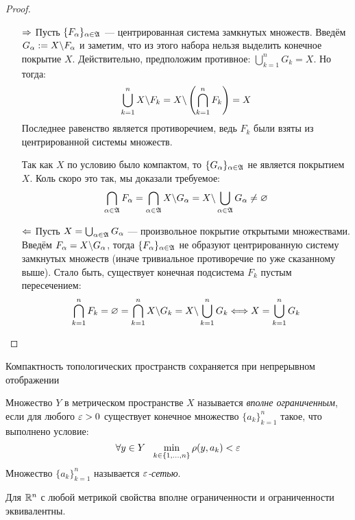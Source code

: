 \begin{proof}~
	\begin{itemize}
		\item[$\Rightarrow$] Пусть $\{F_\alpha\}_{\alpha \in \mathfrak{A}}$ --- центрированная система замкнутых множеств. Введём $G_\alpha := X \backslash F_\alpha$ и заметим, что из этого набора нельзя выделить конечное покрытие $X$. Действительно, предположим противное: $\bigcup_{k = 1}^n G_k = X$. Но тогда:
		\[
			\bigcup_{k = 1}^n X \backslash F_k = X \backslash \left(\bigcap_{k = 1}^n F_k\right) = X
		\]
		Последнее равенство является противоречием, ведь $F_k$ были взяты из центрированной системы множеств.
		
		Так как $X$ по условию было компактом, то $\{G_\alpha\}_{\alpha \in \mathfrak{A}}$ не является покрытием $X$. Коль скоро это так, мы доказали требуемое:
		\[
			\bigcap_{\alpha \in \mathfrak{A}} F_\alpha = \bigcap_{\alpha \in \mathfrak{A}} X \backslash G_\alpha = X \backslash \bigcup_{\alpha \in \mathfrak{A}} G_\alpha \neq \varnothing
		\]
		
		\item[$\Leftarrow$] Пусть $X = \bigcup_{\alpha \in \mathfrak{A}} G_\alpha$ --- произвольное покрытие открытыми множествами. Введём $F_\alpha = X \backslash G_\alpha$, тогда $\{F_\alpha\}_{\alpha \in \mathfrak{A}}$ не образуют центрированную систему замкнутых множеств (иначе тривиальное противоречие по уже сказанному выше). Стало быть, существует конечная подсистема $F_k$ пустым пересечением:
		\[
			\bigcap_{k = 1}^n F_k = \varnothing = \bigcap_{k = 1}^n X \backslash G_k = X \backslash \bigcup_{k = 1}^n G_k \Longleftrightarrow X = \bigcup_{k = 1}^n G_k
		\]
	\end{itemize}
\end{proof}

\begin{exercise}
	Компактность топологических пространств сохраняется при непрерывном отображении
\end{exercise}

\begin{definition}
	Множество $Y$ в метрическом пространстве $X$ называется \textit{вполне ограниченным}, если для любого $\varepsilon > 0$ существует конечное множество $\{a_k\}_{k = 1}^n$ такое, что выполнено условие:
	\[
		\forall y \in Y\ \ \min_{k \in \{1, \ldots, n\}} \rho(y, a_k) < \varepsilon
	\]
	Множество $\{a_k\}_{k = 1}^n$ называется \textit{$\varepsilon$-сетью}.
\end{definition}

\begin{note}
	Для $\mathbb{R}^n$ с любой метрикой свойства вполне ограниченности и ограниченности эквивалентны.
\end{note}

